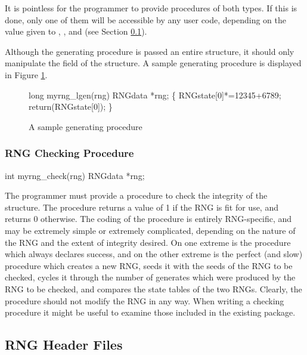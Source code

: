 \noindent
It is pointless for the programmer to provide procedures of both types.
If this is done, only one of them will be accessible by any user code,
depending on the value given to , , and
 (see Section \ref{sec:rngheaders}).

Although the generating procedure is passed an entire 
structure, it should only manipulate the  field of the
structure.  A sample generating procedure is displayed in Figure
\ref{fig:samplegen}.

\begin{figure}
\begin{example}
long myrng_lgen(rng)
RNGdata *rng;
\{
RNGstate[0]*=12345+6789;
return(RNGstate[0]);
\}
\end{example}
\caption{A sample generating procedure}
\label{fig:samplegen}
\end{figure}

\subsubsection{RNG Checking Procedure}

\begin{example}
int myrng_check(rng)
RNGdata *rng;\\
\end{example}

The programmer must provide a procedure to check the
integrity of the  structure.  The procedure returns a value
of 1 if the RNG is fit for use, and returns 0 otherwise.  The
coding of the procedure is entirely RNG-specific, and may be
extremely simple or extremely complicated, depending on the nature
of the RNG and the extent of integrity desired.  On one extreme is
the procedure which always declares success, and on the other
extreme is the perfect (and slow) procedure which creates a new
RNG, seeds it with the seeds of the RNG to be checked, cycles it
through the number of generates which were produced by the RNG to
be checked, and compares the state tables of the two RNGs.
Clearly, the procedure should not modify the RNG in any way.  When
writing a checking procedure it might be useful to examine those
included in the existing package.

\subsection{RNG Header Files}
\label{sec:rngheaders}

